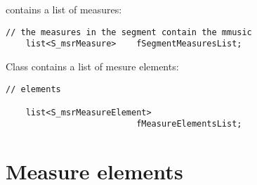  contains a list of measures:
\begin{lstlisting}[language=CPlusPlus]
    // the measures in the segment contain the mmusic
    list<S_msrMeasure>    fSegmentMeasuresList;
\end{lstlisting}

Class {\tt } contains a list of mesure elements:
\begin{lstlisting}[language=CPlusPlus]
    // elements

    list<S_msrMeasureElement>
                          fMeasureElementsList;
\end{lstlisting}


\section{Measure elements}

